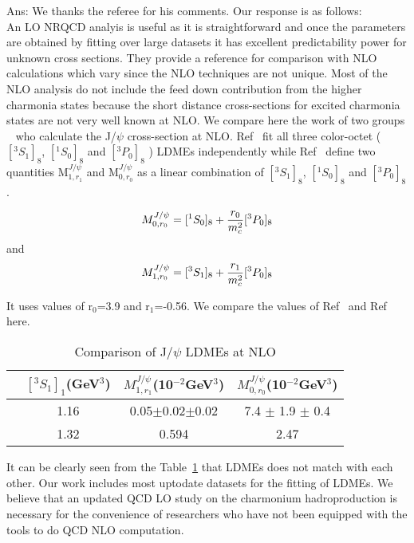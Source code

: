 \documentclass[aps,prc,preprint,superscriptaddress,showpacs,showkeys,amsmath]{revtex4-1}
\begin{document}
{\color{blue}
Ans: We thanks the referee for his comments. Our response is as follows:\\
 An LO NRQCD analyis is useful as it is straightforward and once
the parameters are obtained by fitting over large datasets it has excellent 
predictability power for unknown cross sections. They provide a reference
for comparison with NLO calculations which vary since the NLO techniques are
not unique. Most of the NLO analysis do not include the feed down contribution
from the higher charmonia states because the short distance cross-sections for
excited charmonia states are not very well known at NLO. 
We compare here the work of two groups ~\cite{Butenschoen:2010rq,Ma:2010jj} who calculate the J/$\psi$ cross-section
at NLO. Ref~\cite{Butenschoen:2010rq} fit all three color-octet ($[^3S_1]_{8}$, $[^1S_0]_{8}$ and $[^3P_0]_{8}$ )
LDMEs independently while Ref~\cite{Ma:2010jj} define two quantities M$^{J/\psi}_{1,r_{1}}$  and  M$^{J/\psi}_{0,r_{0}}$
as a linear combination of $[^3S_1]_{8}$, $[^1S_0]_{8}$ and $[^3P_0]_{8}$.

\begin{equation}
M^{J/\psi}_{0,r_{0}} = [^1S_0]_{8}  + \frac{r_{0}}{m_{c}^{2}}[^3P_0]_{8}\\ \nonumber
\end{equation}
and
\begin{equation}
M^{J/\psi}_{1,r_{0}} = [^3S_1]_{8}  + \frac{r_{1}}{m_{c}^{2}}[^3P_0]_{8}\\ \nonumber
\end{equation}

It uses values of r$_{0}$=3.9 and r$_{1}$=-0.56. We compare the values of Ref~\cite{Butenschoen:2010rq}
and Ref~\cite{Ma:2010jj} here.

\begin{table}[h]
\caption{Comparison of J/$\psi$ LDMEs at NLO}
\begin{tabular}{|l|c|c|c|}
\hline            
                             &$[^3S_1]_{1}$(GeV$^3$)                     &$M^{J/\psi}_{1,r_{1}}$(10$^{-2}$GeV$^3$)    &$M^{J/\psi}_{0,r_{0}}$(10$^{-2}$GeV$^3$)  \\        
\hline
\cite{Ma:2010jj}             &1.16                                     &0.05$\pm$0.02$\pm$0.02              &7.4 $\pm$ 1.9 $\pm$ 0.4 \\
\cite{Butenschoen:2010rq}    &1.32                                     &0.594                               &2.47 \\
\hline
\end{tabular}
\label{table:LDMEJPsiNLO}
\end{table}
It can be clearly seen from the Table~\ref{table:LDMEJPsiNLO} that LDMEs does not match with each 
other. Our work includes most uptodate datasets for the fitting of LDMEs. We believe that an updated 
QCD LO study on the charmonium hadroproduction is necessary for the convenience of 
researchers who have not been equipped with the tools to do QCD NLO computation.
}
 \\
\end{document}
